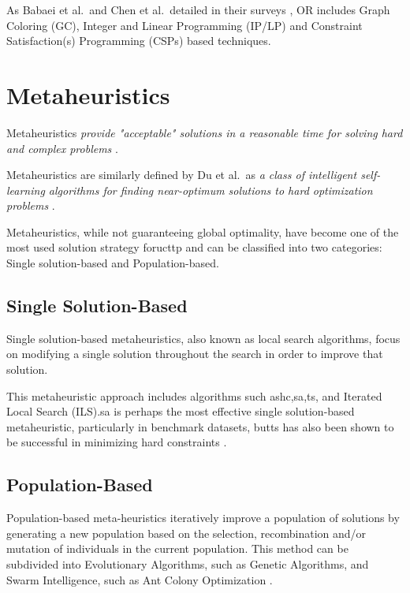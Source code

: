 As Babaei et al.\ and Chen et al.\ detailed in their surveys \cite{babaei_survey_2015,chen_survey_2021}, OR includes Graph Coloring (GC), Integer and Linear Programming (IP/LP) and Constraint Satisfaction(s) Programming (CSPs) based techniques.

\section{Metaheuristics}

Metaheuristics \textit{provide "acceptable" solutions in a reasonable time for solving hard and complex problems} \cite{talbi2009metaheuristics}. 

Metaheuristics are similarly defined by Du et al.\ as \textit{a class of intelligent self-learning algorithms for finding near-optimum solutions to hard optimization problems} \cite{du2016search}.

Metaheuristics, while not guaranteeing global optimality, have become one of the most used solution strategy for\ac{ucttp} and can be classified into two categories: Single solution-based and Population-based.

\subsection{Single Solution-Based}

Single solution-based metaheuristics, also known as local search algorithms, focus on modifying a single solution throughout the search in order to improve that solution. 

This metaheuristic approach includes algorithms such as\ac{hc},\ac{sa},\ac{ts}, and Iterated Local Search (ILS).\ac{sa} is perhaps the most effective single solution-based metaheuristic, particularly in benchmark datasets, but\ac{ts} has also been shown to be successful in minimizing hard constraints \cite{abdipoor_meta-heuristic_2023}.

\subsection{Population-Based}

Population-based meta-heuristics iteratively improve a population of solutions by generating a new population based on the selection, recombination and/or mutation of individuals in the current population. This method can be subdivided into Evolutionary Algorithms, such as Genetic Algorithms, and Swarm Intelligence, such as Ant Colony Optimization \cite{abdipoor_meta-heuristic_2023,du2016search}.

